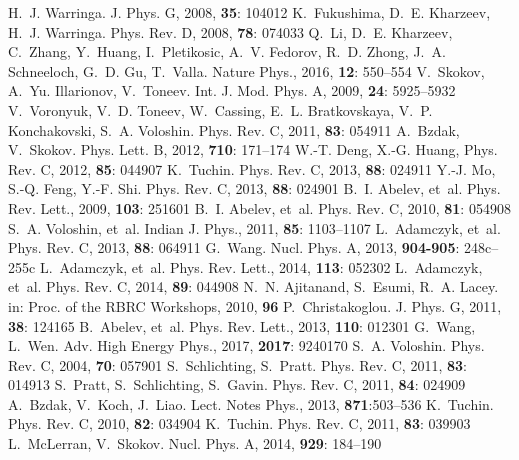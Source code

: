 \documentclass[a4paper,10pt,twoside]{cpc-hepnp}
\begin{document}
\begin{CJK*}{GBK}{song}
\begin{multicols}{2}
\begin{thebibliography}{90}
 H.~J. Warringa. J. Phys. G, 2008, \textbf{35}: 104012
 K.~Fukushima, D.~E. Kharzeev, H.~J. Warringa. Phys. Rev. D, 2008, \textbf{78}: 074033
 Q.~Li, D.~E. Kharzeev, C.~Zhang, Y.~Huang, I.~Pletikosic, A.~V. Fedorov, R.~D. Zhong, J.~A. Schneeloch, G.~D. Gu, T.~Valla. Nature Phys., 2016, \textbf{12}: 550--554
 V.~Skokov, A.~Yu. Illarionov, V.~Toneev. Int. J. Mod. Phys. A, 2009, \textbf{24}: 5925--5932
 V.~Voronyuk, V.~D. Toneev, W.~Cassing, E.~L. Bratkovskaya, V.~P. Konchakovski, S.~A. Voloshin. Phys. Rev. C, 2011, \textbf{83}: 054911
 A.~Bzdak, V.~Skokov. Phys. Lett. B, 2012, \textbf{710}: 171--174
 W.-T. Deng, X.-G. Huang, Phys. Rev. C, 2012, \textbf{85}: 044907
 K.~Tuchin. Phys. Rev. C, 2013, \textbf{88}: 024911
 Y.-J. Mo, S.-Q. Feng, Y.-F. Shi. Phys. Rev. C, 2013, \textbf{88}: 024901
 B.~I. Abelev, et~al. Phys. Rev. Lett., 2009, \textbf{103}: 251601
 B.~I. Abelev, et~al. Phys. Rev. C, 2010, \textbf{81}: 054908
 S.~A. Voloshin, et~al. Indian J. Phys., 2011, \textbf{85}: 1103--1107
 L.~Adamczyk, et~al. Phys. Rev. C, 2013, \textbf{88}: 064911
 G.~Wang. Nucl. Phys. A, 2013, \textbf{904-905}: 248c--255c
 L.~Adamczyk, et~al. Phys. Rev. Lett., 2014, \textbf{113}: 052302
 L.~Adamczyk, et~al. Phys. Rev. C, 2014, \textbf{89}: 044908
 N.~N. Ajitanand, S.~Esumi, R.~A. Lacey. in: Proc. of the RBRC Workshops, 2010, \textbf{96}
 P.~Christakoglou. J. Phys. G, 2011, \textbf{38}: 124165
 B.~Abelev, et~al. Phys. Rev. Lett., 2013, \textbf{110}: 012301
 G.~Wang, L.~Wen. Adv. High Energy Phys., 2017, \textbf{2017}: 9240170
 S.~A. Voloshin. Phys. Rev. C, 2004, \textbf{70}: 057901
 S.~Schlichting, S.~Pratt. Phys. Rev. C, 2011, \textbf{83}: 014913
 S.~Pratt, S.~Schlichting, S.~Gavin. Phys. Rev. C, 2011, \textbf{84}: 024909
 A.~Bzdak, V.~Koch, J.~Liao. Lect. Notes Phys., 2013, \textbf{871}:503--536
 K.~Tuchin. Phys. Rev. C, 2010, \textbf{82}: 034904
 K.~Tuchin. Phys. Rev. C, 2011, \textbf{83}: 039903
 L.~McLerran, V.~Skokov. Nucl. Phys. A, 2014, \textbf{929}: 184--190

\end{thebibliography}
\end{multicols}
\end{CJK*}
\end{document}
